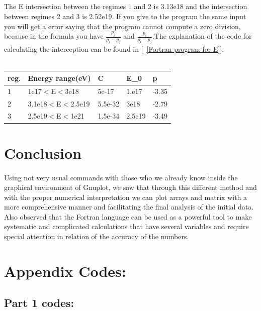 \documentclass[twocolumn]{article}
\begin{document}
\subsection{}
The E intersection between the regimes 1 and 2 is 3.13e18 and the intersection between regimes 2 and 3
is 2.52e19. If you give to the program the same input you will get a error saying that the program cannot compute a zero division, because in the formula you have $\frac{p_j}{p_i-p_j}$ and $\frac{p_i}{p_i-p_j}$.The explanation of the code for calculating the interception can be found in [~\ref{Fortran program for E}].\\
\\
\begin{tabular}{|l|l|l|l|l|}
\hline{}
reg.&Energy range(eV)&C&E_0&p \\\hline
1&1e17$<$E$<$3e18 & 5e-17&1.e17&-3.35\\\hline
2&3.1e18$<$E$<$2.5e19&5.5e-32&3e18&-2.79  \\\hline
3&2.5e19$<$E$<$1e21&1.5e-34&2.5e19&-3.49\\\hline 
\end{tabular}

\section{Conclusion}
\paragraph{}
Using not very usual commands with those who we already know inside the graphical environment of Gnuplot, we saw that through this different method and with the proper numerical interpretation we can plot arrays and matrix with a more comprehensive manner and facilitating the final analysis of the initial data.
Also observed that the Fortran language can be used as a powerful tool to make systematic and complicated calculations that have several variables and require special attention in relation of the accuracy of the numbers.
\section{Appendix Codes:}

\subsection{Part 1 codes:}
\end{document}
